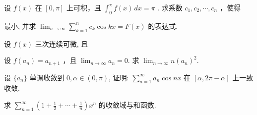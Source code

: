 \par{}
设  $f(x)$  在  $[0, \pi]$  上可积，且  $\int_{0}^{\pi} f(x) \, dx = \pi$ . 求系数  $c_{1}, c_{2}, \cdots, c_{n}$ ，使得\par
\nopagebreak[4]
最小, 并求 $\lim_{n\to \infty}\sum_{k = 1}^{n}c_k\cos kx = F(x)$ 的表达式.\par
\par{}
设 $f(x)$ 三次连续可微, 且\par
\nopagebreak[4]
设 $f(a_{n}) = a_{n + 1}$ ，且 $\lim_{n\to \infty}a_n = 0.$ 求 $\lim_{n\to \infty}n(a_n)^2.$\par
设 $\{a_{n}\}$ 单调收敛到 $0, \alpha \in (0, \pi)$, 证明: $\sum_{n=1}^{\infty} a_{n} \cos nx$ 在 $[\alpha, 2\pi - \alpha]$ 上一致收敛.\par
求  $\sum_{n=1}^{\infty}\left(1+\frac{1}{2}+\cdots+\frac{1}{n}\right)x^{n}$  的收敛域与和函数.\par
